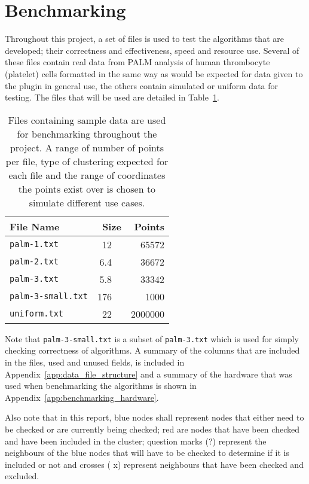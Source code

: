 
\section{Benchmarking}
\label{sec:benchmarking}

Throughout this project, a set of files is used to test the algorithms that are
developed; their correctness and effectiveness, speed and resource use.
Several of these files contain real data from PALM analysis of human
thrombocyte (platelet) cells formatted in the same way as would be expected for
data given to the plugin in general use, the others contain simulated or
uniform data for testing. The files that will be used are detailed in
Table~\ref{tab:benchmarking-files}.

\renewcommand{\arraystretch}{1.3}
\begin{table}[htbp]
\centering
\begin{tabular} {l r r}
	\toprule
	File Name & Size & Points \\
	\midrule
	\texttt{palm-1.txt} & \SI{12}{\mebi\byte} & 65572 \\
	\texttt{palm-2.txt} & \SI{6.4}{\mebi\byte} & 36672 \\
	\texttt{palm-3.txt} & \SI{5.8}{\mebi\byte} & 33342 \\
	\texttt{palm-3-small.txt} & \SI{176}{\kibi\byte} & 1000 \\
	\texttt{uniform.txt} & \SI{22}{\mebi\byte} & 2000000 \\
	\bottomrule
\end{tabular}

\caption[Sample data files used for testing and benchmarking.]{Files containing
	sample data are used for benchmarking throughout the project. A range of
	number of points per file, type of clustering expected for each file and
	the range of coordinates the points exist over is chosen to simulate
	different use cases.}\label{tab:benchmarking-files}
\end{table}

Note that \texttt{palm-3-small.txt} is a subset of \texttt{palm-3.txt} which
is used for simply checking correctness of algorithms. A summary of the
columns that are included in the files, used and unused fields, is included in
Appendix~\ref{app:data_file_structure} and a summary of the hardware that was
used when benchmarking the algorithms is shown in
Appendix~\ref{app:benchmarking_hardware}.

Also note that in this report, blue nodes shall represent nodes that either
need to be checked or are currently being checked; red are nodes that have been
checked and have been included in the cluster; question marks
({\footnotesize?}) represent the neighbours of the blue nodes that will have to
be checked to determine if it is included or not and crosses ({\footnotesize
x}) represent neighbours that have been checked and excluded.
